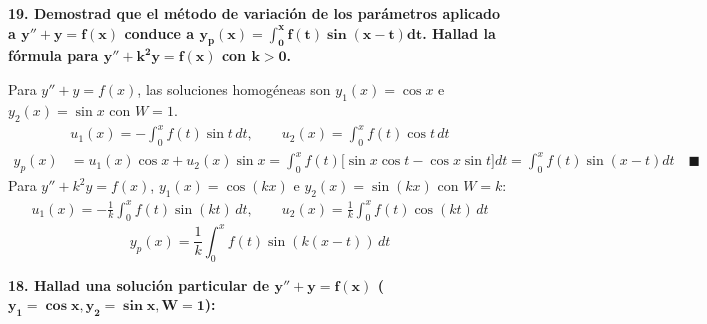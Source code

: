 \documentclass[11pt, a4paper]{article}
\begin{document}
\noindent\textbf{19. Demostrad que el método de variación de los parámetros aplicado a $\bm{y''+y=f(x)}$ conduce a $\bm{y_p(x)=\int_0^x f(t)\sin(x-t)dt}$. Hallad la fórmula para $\bm{y''+k^2y=f(x)}$ con $\bm{k>0}$.}

\noindent Para $y''+y=f(x)$, las soluciones homogéneas son $y_1(x) = \cos x$ e $y_2(x) = \sin x$ con $W=1$.
\begin{align*}
u_1(x) = -\int_0^x f(t)\sin t \, dt, \qquad u_2(x) = \int_0^x f(t)\cos t \, dt
\end{align*}
\begin{align*}
y_p(x) &= u_1(x)\cos x + u_2(x)\sin x = \int_0^x f(t) \big[\sin x \cos t - \cos x \sin t\big] dt = \int_0^x f(t)\sin(x-t) dt \quad \blacksquare
\end{align*}
Para $y''+k^2 y = f(x)$, $y_1(x) = \cos(kx)$ e $y_2(x) = \sin(kx)$ con $W = k$:
\begin{align*}
u_1(x) = -\frac{1}{k}\int_0^x f(t)\sin(kt) \, dt, \qquad u_2(x) = \frac{1}{k}\int_0^x f(t)\cos(kt) \, dt
\end{align*}
\[
\boxed{y_p(x) = \frac{1}{k}\int_0^x f(t)\sin(k(x-t)) \, dt}
\]

\noindent\textbf{18. Hallad una solución particular de $\bm{y''+y=f(x)}$ ($\bm{y_1=\cos x, y_2=\sin x, W=1}$):}
\end{document}
